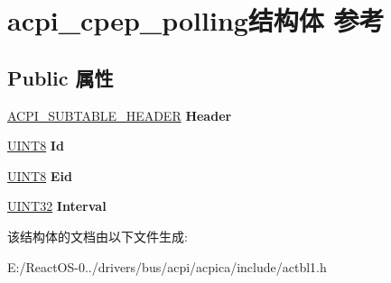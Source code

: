 \hypertarget{structacpi__cpep__polling}{}\section{acpi\+\_\+cpep\+\_\+polling结构体 参考}
\label{structacpi__cpep__polling}
\subsection*{Public 属性}
\begin{DoxyCompactItemize}
\item 
\mbox{\label{structacpi__cpep__polling_af0c40170c806dbc1386e966b708e5812}} 
\hyperlink{structacpi__subtable__header}{A\+C\+P\+I\+\_\+\+S\+U\+B\+T\+A\+B\+L\+E\+\_\+\+H\+E\+A\+D\+ER} {\bfseries Header}
\item 
\mbox{\label{structacpi__cpep__polling_a7bcfef0c20feb2452ce54e9b3dec295f}} 
\hyperlink{_processor_bind_8h_ab27e9918b538ce9d8ca692479b375b6a}{U\+I\+N\+T8} {\bfseries Id}
\item 
\mbox{\label{structacpi__cpep__polling_a0ea2528dc8c97d29700ca473f13e5ff7}} 
\hyperlink{_processor_bind_8h_ab27e9918b538ce9d8ca692479b375b6a}{U\+I\+N\+T8} {\bfseries Eid}
\item 
\mbox{\label{structacpi__cpep__polling_aed8b50034494abf3176f4b8d46bb6019}} 
\hyperlink{_processor_bind_8h_ae1e6edbbc26d6fbc71a90190d0266018}{U\+I\+N\+T32} {\bfseries Interval}
\end{DoxyCompactItemize}


该结构体的文档由以下文件生成\+:\begin{DoxyCompactItemize}
\item 
E\+:/\+React\+O\+S-\/0../drivers/bus/acpi/acpica/include/actbl1.\+h\end{DoxyCompactItemize}
